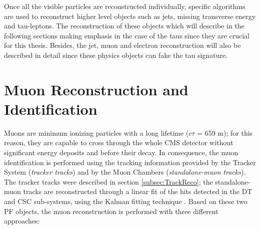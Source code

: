 \noindent Once all the visible particles are reconstructed individually, specific algorithms 
are used to reconstruct higher level objects such as jets, missing transverse energy and 
tau-leptons. The reconstruction of these objects which will describe in the following sections 
making emphasis in the case of the taus since they are crucial for this thesis. Besides, the jet, muon and 
electron reconstruction will also be described in detail since these physics objects can 
fake the tau signature.

\section{Muon Reconstruction and Identification}
\label{sec:Muon}

Muons are minimum ionizing particles with a long lifetime ($c\tau$ = 659 m); for 
this reason, they are capable to cross through the whole CMS detector 
without significant energy deposits and before their decay. In consequence, 
the muon identification is performed using the tracking information 
provided by the Tracker System (\textit{tracker tracks}) and by the Muon 
Chambers (\textit{standalone-muon tracks}). The tracker tracks were described
in section \ref{subsec:TrackReco}; the standalone-muon tracks are 
reconstructed through a linear fit of the hits detected
in the DT and CSC sub-systems, using the Kalman fitting 
technique \cite{KalmanAlgorithm}. Based on these two PF objects,
the muon reconstruction \cite{MuonID7TeV} is performed with 
three different approaches: 

